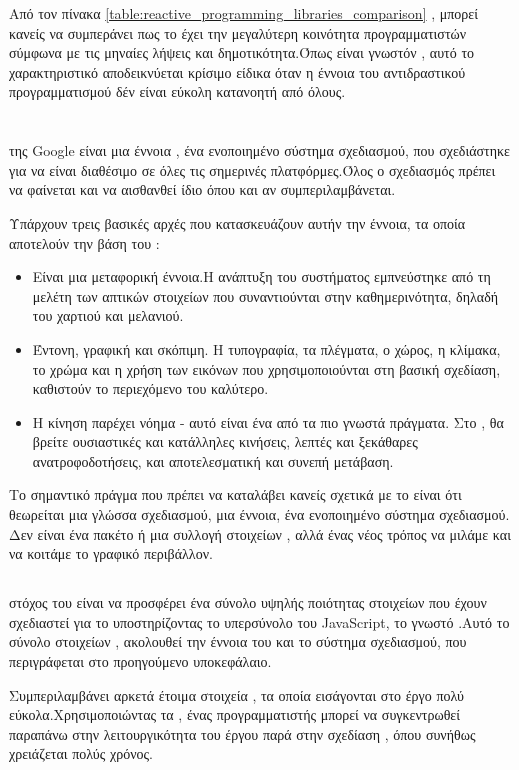 Από τον πίνακα \ref{table:reactive_programming_libraries_comparison} , μπορεί κανείς να συμπεράνει πως το  έχει την μεγαλύτερη κοινότητα προγραμματιστών σύμφωνα με τις μηναίες λήψεις και δημοτικότητα.Όπως είναι γνωστόν , αυτό το χαρακτηριστικό αποδεικνύεται κρίσιμο είδικα όταν η έννοια του αντιδραστικού προγραμματισμού δέν είναι εύκολη κατανοητή από όλους.

\section{}
  της \textlatin{Google} είναι μια έννοια , ένα ενοποιημένο σύστημα σχεδιασμού, που σχεδιάστηκε για να είναι διαθέσιμο σε όλες τις σημερινές πλατφόρμες.Όλος ο σχεδιασμός πρέπει να φαίνεται και να αισθανθεί ίδιο όπου και αν συμπεριλαμβάνεται.

Υπάρχουν τρεις βασικές αρχές που κατασκευάζουν αυτήν την έννοια, τα οποία αποτελούν την βάση του :

\begin{itemize}
    \item Είναι μια μεταφορική έννοια.Η ανάπτυξη του συστήματος εμπνεύστηκε από τη μελέτη των απτικών στοιχείων που συναντιούνται στην καθημερινότητα, δηλαδή του χαρτιού και μελανιού. 
    \item Έντονη, γραφική και σκόπιμη. Η τυπογραφία, τα πλέγματα, ο χώρος, η κλίμακα, το χρώμα και η χρήση των εικόνων που χρησιμοποιούνται στη βασική σχεδίαση, καθιστούν το περιεχόμενο του  καλύτερο.
    \item Η κίνηση παρέχει νόημα - αυτό είναι ένα από τα πιο γνωστά πράγματα. Στο , θα βρείτε ουσιαστικές και κατάλληλες κινήσεις, λεπτές και ξεκάθαρες ανατροφοδοτήσεις, και αποτελεσματική και συνεπή μετάβαση.
\end{itemize}

Το σημαντικό πράγμα που πρέπει να καταλάβει κανείς σχετικά με το  είναι ότι θεωρείται μια γλώσσα σχεδιασμού, μια έννοια, ένα ενοποιημένο σύστημα σχεδιασμού. Δεν είναι ένα πακέτο  ή μια συλλογή στοιχείων , αλλά ένας νέος τρόπος να μιλάμε και να κοιτάμε το γραφικό περιβάλλον.

\subsection*{}
 στόχος του είναι να προσφέρει ένα σύνολο υψηλής ποιότητας στοιχείων  που έχουν σχεδιαστεί για το  υποστηρίζοντας το υπερσύνολο του \textlatin{JavaScript}, το γνωστό .Αυτό το σύνολο στοιχείων , ακολουθεί την έννοια του  και το σύστημα σχεδιασμού, που περιγράφεται στο προηγούμενο υποκεφάλαιο.\par
Συμπεριλαμβάνει αρκετά έτοιμα στοιχεία , τα οποία εισάγονται στο έργο πολύ εύκολα.Χρησιμοποιώντας τα , ένας προγραμματιστής μπορεί να συγκεντρωθεί παραπάνω στην λειτουργικότητα του έργου παρά στην σχεδίαση , όπου συνήθως χρειάζεται πολύς χρόνος.\par

